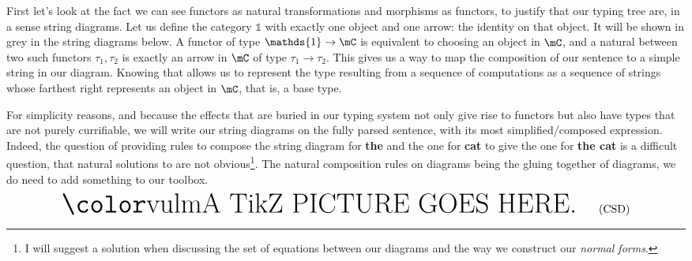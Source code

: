 \medskip

First let's look at the fact we can see functors as natural transformations and morphisms as functors, to justify that our typing tree are, in a sense string diagrams.
Let us define the category $\mathds{1}$ with exactly one object and one arrow: the identity on that object. It will be shown in grey in the string diagrams below.
A functor of type $\mathds{1} \to \mC$ is equivalent to choosing an object in $\mC$, and a natural between two such functors $\tau_{1}, \tau_{2}$ is exactly an arrow in $\mC$ of type $\tau_{1} \to \tau_{2}$.
This gives us a way to map the composition of our sentence to a simple string in our diagram.
Knowing that allows us to represent the type resulting from a sequence of computations as a sequence of strings whose farthest right represents an object in $\mC$, that is, a base type.
\begin{center}
\end{center}

For simplicity reasons, and because the effects that are buried in our typing system not only give rise to functors but also have types that are not purely currifiable, we will write our string diagrams on the fully parsed sentence, with its most simplified/composed expression.
Indeed, the question of providing rules to compose the string diagram for \textbf{the} and the one for \textbf{cat} to give the one for \textbf{the cat} is a difficult question, that natural solutions to are not obvious\footnote{I will suggest a solution when discussing the set of equations between our diagrams and the way we construct our \emph{normal forms}.}.
The natural composition rules on diagrams being the gluing together of diagrams, we do need to add something to our toolbox.
\begin{equation}
	\inputtikz{sd-csd-example}
	\label{eq:CSD}
	\tag{CSD}
\end{equation}

